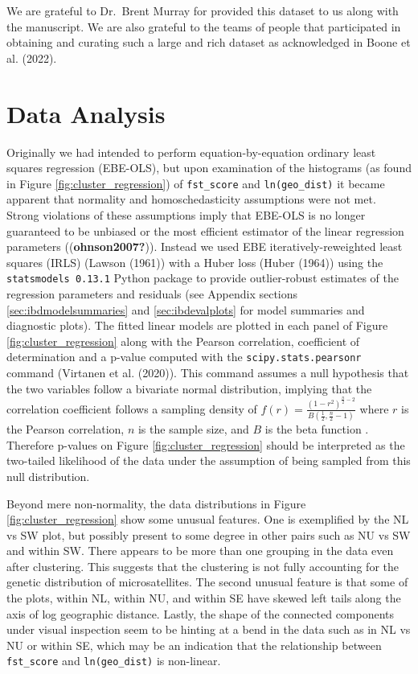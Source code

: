 \documentclass[
  letterpaper,
  DIV=11,
  numbers=noendperiod]{scrreprt}
\begin{document}
We are grateful to Dr.~Brent Murray for provided this dataset to us
along with the \cite{booneunpublished} manuscript. We are also grateful
to the teams of people that participated in obtaining and curating such
a large and rich dataset as acknowledged in Boone et al. (2022).

\section{Data Analysis}\label{data-analysis}

Originally we had intended to perform equation-by-equation ordinary
least squares regression (EBE-OLS), but upon examination of the
histograms (as found in Figure \ref{fig:cluster_regression}) of
\texttt{fst\_score} and \texttt{ln(geo\_dist)} it became apparent that
normality and homoschedasticity assumptions were not met. Strong
violations of these assumptions imply that EBE-OLS is no longer
guaranteed to be unbiased or the most efficient estimator of the linear
regression parameters ((\textbf{ohnson2007?})). Instead we used EBE
iteratively-reweighted least squares (IRLS) (Lawson (1961)) with a Huber
loss (Huber (1964)) using the \texttt{statsmodels 0.13.1} Python package
to provide outlier-robust estimates of the regression parameters and
residuals (see Appendix sections \ref{sec:ibdmodelsummaries} and
\ref{sec:ibdevalplots} for model summaries and diagnostic plots). The
fitted linear models are plotted in each panel of Figure
\ref{fig:cluster_regression} along with the Pearson correlation,
coefficient of determination and a p-value computed with the
\texttt{scipy.stats.pearsonr} command (Virtanen et al. (2020)). This
command assumes a null hypothesis that the two variables follow a
bivariate normal distribution, implying that the correlation coefficient
follows a sampling density of
\(f(r) = \frac{(1 - r^2)^{\frac{n}{2} - 2}}{B(\frac{1}{2}, \frac{n}{2} - 1)}\)
where \(r\) is the Pearson correlation, \(n\) is the sample size, and
\(B\) is the beta function \cite{Student1908}. Therefore p-values on
Figure \ref{fig:cluster_regression} should be interpreted as the
two-tailed likelihood of the data under the assumption of being sampled
from this null distribution.

Beyond mere non-normality, the data distributions in Figure
\ref{fig:cluster_regression} show some unusual features. One is
exemplified by the NL vs SW plot, but possibly present to some degree in
other pairs such as NU vs SW and within SW. There appears to be more
than one grouping in the data even after clustering. This suggests that
the clustering is not fully accounting for the genetic distribution of
microsatellites. The second unusual feature is that some of the plots,
within NL, within NU, and within SE have skewed left tails along the
axis of log geographic distance. Lastly, the shape of the connected
components under visual inspection seem to be hinting at a bend in the
data such as in NL vs NU or within SE, which may be an indication that
the relationship between \texttt{fst\_score} and \texttt{ln(geo\_dist)}
is non-linear.
\end{document}
